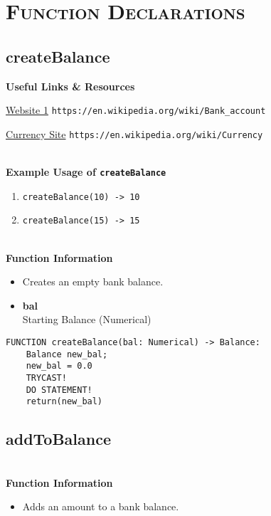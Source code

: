 
\section{\textsc{Function Declarations}}
\clearpage

\subsection{createBalance}

\textbf{Useful Links \& Resources}

\href{https://en.wikipedia.org/wiki/Bank_account}{Website 1} \hfill \verb|https://en.wikipedia.org/wiki/Bank_account| 

\href{https://en.wikipedia.org/wiki/Currency}{Currency Site} \hfill \verb|https://en.wikipedia.org/wiki/Currency| 

\textbf{ \\ Example Usage of \texttt{createBalance}}
\begin{enumerate}
	\setlength{\itemsep}{5pt}
	\setlength{\parskip}{0pt}
	\setlength{\parsep}{0pt}
	\item \verb|createBalance(10) -> 10|
	\item \verb|createBalance(15) -> 15|
\end{enumerate}

\textbf{ \\ Function Information}
\begin{itemize}
	\setlength{\itemsep}{5pt}
	\setlength{\parskip}{0pt}
	\setlength{\parsep}{0pt}
	\item Creates an empty bank balance.
	\item \textbf{bal} \\ Starting Balance (Numerical)
\end{itemize}

\begin{verbatim}
FUNCTION createBalance(bal: Numerical) -> Balance:
	Balance new_bal;
	new_bal = 0.0
	TRYCAST!
	DO STATEMENT!
	return(new_bal)
\end{verbatim}

\clearpage

\subsection{addToBalance}
\textbf{ \\ Function Information}
\begin{itemize}
	\setlength{\itemsep}{5pt}
	\setlength{\parskip}{0pt}
	\setlength{\parsep}{0pt}
	\item Adds an amount to a bank balance.
\end{itemize}

